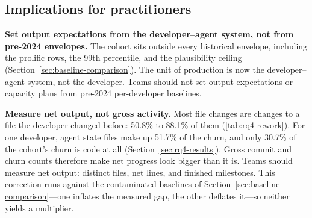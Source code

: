 %
%

\subsection{Implications for practitioners}
\label{sec:implications-practitioners}

\textbf{Set output expectations from the developer--agent system, not from
pre-2024 envelopes.}
The cohort sits outside every historical envelope, including the prolific rows,
the 99th percentile, and the plausibility ceiling
(Section~\ref{sec:baseline-comparison}).
The unit of production is now the developer--agent system, not the developer.
Teams should not set output expectations or capacity plans from pre-2024
per-developer baselines.

\textbf{Measure net output, not gross activity.}
Most file changes are changes to a file the developer changed before: 50.8\% to
88.1\% of them (\autoref{tab:rq4-rework}).
For one developer, agent state files make up 51.7\% of the churn, and only 30.7\%
of the cohort's churn is code at all (Section~\ref{sec:rq4-results}).
Gross commit and churn counts therefore make net progress look bigger than it
is.
Teams should measure net output: distinct files, net lines, and finished
milestones.
This correction runs against the contaminated baselines of
Section~\ref{sec:baseline-comparison}---one inflates the measured gap, the other
deflates it---so neither yields a multiplier.

